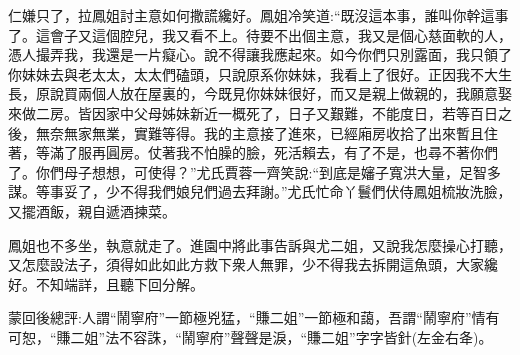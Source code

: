 \begin{parag}
仁嫌只了，拉鳳姐討主意如何撒謊纔好。鳳姐冷笑道:“既沒這本事，誰叫你幹這事了。這會子又這個腔兒，我又看不上。待要不出個主意，我又是個心慈面軟的人，憑人撮弄我，我還是一片癡心。說不得讓我應起來。如今你們只別露面，我只領了你妹妹去與老太太，太太們磕頭，只說原系你妹妹，我看上了很好。正因我不大生長，原說買兩個人放在屋裏的，今既見你妹妹很好，而又是親上做親的，我願意娶來做二房。皆因家中父母姊妹新近一概死了，日子又艱難，不能度日，若等百日之後，無奈無家無業，實難等得。我的主意接了進來，已經廂房收拾了出來暫且住著，等滿了服再圓房。仗著我不怕臊的臉，死活賴去，有了不是，也尋不著你們了。你們母子想想，可使得？”尤氏賈蓉一齊笑說:“到底是嬸子寬洪大量，足智多謀。等事妥了，少不得我們娘兒們過去拜謝。”尤氏忙命丫鬟們伏侍鳳姐梳妝洗臉，又擺酒飯，親自遞酒揀菜。
\end{parag}


\begin{parag}
    鳳姐也不多坐，執意就走了。進園中將此事告訴與尤二姐，又說我怎麼操心打聽，又怎麼設法子，須得如此如此方救下衆人無罪，少不得我去拆開這魚頭，大家纔好。不知端詳，且聽下回分解。
\end{parag}


\begin{parag}
    \begin{note}蒙回後總評:人謂“鬧寧府”一節極兇猛，“賺二姐”一節極和藹，吾謂“鬧寧府”情有可恕，“賺二姐”法不容誅，“鬧寧府”聲聲是淚，“賺二姐”字字皆針(左金右夅)。\end{note}
\end{parag}
